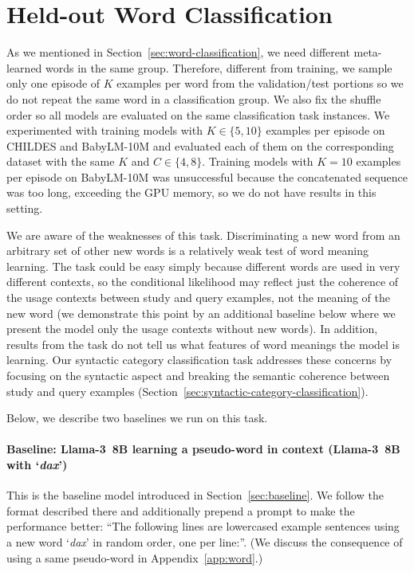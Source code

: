 \documentclass{article}
\begin{document}
\section{Held-out Word Classification}
\label{app:word-classification}
As we mentioned in Section~\ref{sec:word-classification}, we need different meta-learned words in the same group. Therefore, different from training, we sample only one episode of $K$ examples per word from the validation/test portions so we do not repeat the same word in a classification group. We also fix the shuffle order so all models are evaluated on the same classification task instances.
We experimented with training models with $K \in \{5, 10\}$ examples per episode on CHILDES and BabyLM-10M and evaluated each of them on the corresponding dataset with the same $K$ and $C \in \{4, 8\}$. Training models with $K = 10$ examples per episode on BabyLM-10M was unsuccessful because the concatenated sequence was too long, exceeding the GPU memory, so we do not have results in this setting.

We are aware of the weaknesses of this task.
Discriminating a new word from an arbitrary set of other new words is a relatively weak test of word meaning learning.
The task could be easy simply because different words are used in very different contexts, so the conditional likelihood may reflect just the coherence of the usage contexts between study and query examples, not the meaning of the new word (we demonstrate this point by an additional baseline below where we present the model only the usage contexts without new words).
In addition, results from the task do not tell us what features of word meanings the model is learning.
Our syntactic category classification task addresses these concerns by focusing on the syntactic aspect and breaking the semantic coherence between study and query examples (Section~\ref{sec:syntactic-category-classification}).

Below, we describe two baselines we run on this task.

\paragraph{Baseline: \mbox{Llama-3 8B} learning a pseudo-word in context (\mbox{Llama-3 8B} with `\textit{dax}')}
This is the baseline model introduced in Section~\ref{sec:baseline}. We follow the format described there and additionally prepend a prompt to make the performance better: ``The following lines are lowercased example sentences using a new word `\textit{dax}' in random order, one per line:''. (We discuss the consequence of using a same pseudo-word in Appendix~\ref{app:word}.)
\end{document}
